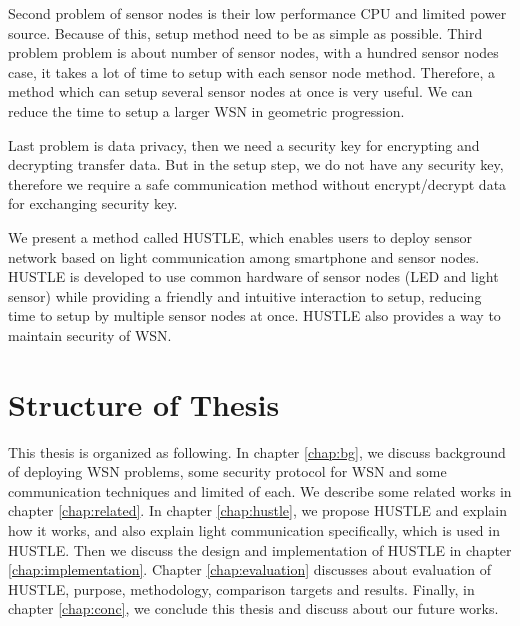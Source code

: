 Second problem of sensor nodes is their low performance CPU and limited power source. Because of this, setup method need to be as simple as possible. Third problem problem is about number of sensor nodes, with a hundred sensor nodes case, it takes a lot of time to setup with each sensor node method. Therefore, a method which can setup several sensor nodes at once is very useful. We can reduce the time to setup a larger WSN in geometric progression.

Last problem is data privacy, then we need a security key for encrypting and decrypting transfer data. But in the setup step, we do not have any security key, therefore we require a safe communication method without encrypt/decrypt data for exchanging security key.

We present a method called HUSTLE, which enables users to deploy sensor network based on light communication among smartphone and sensor nodes. HUSTLE is developed to use common hardware of sensor nodes (LED and light sensor) while providing a friendly and intuitive interaction to setup, reducing time to setup by multiple sensor nodes at once. HUSTLE also provides a way to maintain security of WSN.

\section{Structure of Thesis}\label{sec:intro_structure}
This thesis is organized as following. In chapter \ref{chap:bg}, we discuss background of deploying WSN problems, some security protocol for WSN and some communication techniques and limited of each. We describe some related works in chapter \ref{chap:related}. In chapter \ref{chap:hustle}, we propose HUSTLE and explain how it works, and also explain light communication specifically, which is used in HUSTLE. Then we discuss the design and implementation of HUSTLE in chapter \ref{chap:implementation}. Chapter \ref{chap:evaluation} discusses about evaluation of HUSTLE, purpose, methodology, comparison targets and results. Finally, in chapter \ref{chap:conc}, we conclude this thesis and discuss about our future works.